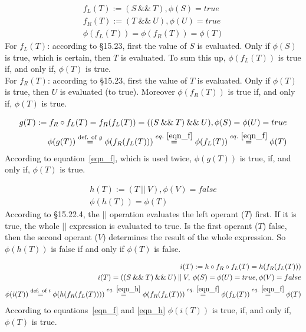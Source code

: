 \begin{equation}\label{eqn_f}\begin{split}
f_{L}(T) := (S \:\&\&\: T), \phi(S) = true\\
f_{R}(T) := (T \:\&\&\: U), \phi(U) = true\\
\phi(f_{L}(T)) = \phi(f_{R}(T)) = \phi(T)
\end{split}\end{equation}
For $f_{L}(T)$: according to §15.23, first the value of $S$ is evaluated. Only if $\phi(S)$ is true, which is certain, then $T$ is evaluated. To sum this up, $\phi(f_{L}(T))$ is true if, and only if, $\phi(T)$ is true.\\
For $f_{R}(T)$: according to §15.23, first the value of $T$ is evaluated. Only if $\phi(T)$ is true, then $U$ is evaluated (to true). Moreover $\phi(f_{R}(T))$ is true if, and only if, $\phi(T)$ is true.

\begin{equation}\label{eqn_g}\begin{split}
g(T) := f_{R} \circ f_{L}(T) = f_{R}(f_{L}(T)) = ((S \: \&\& \: T) \: \&\& \: U), \phi(S) = \phi(U) = true\\
\phi(g(T)) \stackrel{\text{def. of $g$}}{=} \phi(f_{R}(f_{L}(T))) \stackrel{eq.~\eqref{eqn_f}}{=} \phi(f_{L}(T)) \stackrel{eq.~\eqref{eqn_f}}{=} \phi(T)
\end{split}\end{equation}
According to equation~\eqref{eqn_f}, which is used twice, $\phi(g(T))$ is true, if, and only if, $\phi(T)$ is true.

\begin{equation}\label{eqn_h}\begin{split}
h(T) := (T \: || \: V), \phi(V) = false\\
\phi(h(T)) = \phi(T)
\end{split}\end{equation}
According to §15.22.4, the $||$ operation evaluates the left operant ($T$) first. If it is true, the whole $||$ expression is evaluated to true. Is the first operant ($T$) false, then the second operant ($V$) determines the result of the whole expression. So $\phi(h(T))$ is false if and only if $\phi(T)$ is false.

\begin{equation}\label{eqn_i}\begin{split}
i(T) := h \circ f_{R} \circ f_{L}(T) = h(f_{R}(f_{L}(T)))\\
i(T) = ((S \: \&\& \: T) \: \&\& \: U) \: || \: V, \: \phi(S) = \phi(U) = true, \phi(V) = false\\
\phi(i(T)) \stackrel{\text{def. of $i$}}{=} \phi(h(f_{R}(f_{L}(T)))) \stackrel{eq.~\eqref{eqn_h}}{=} \phi(f_{R}(f_{L}(T))) \stackrel{eq.~\eqref{eqn_f}}{=} \phi(f_{L}(T)) \stackrel{eq.~\eqref{eqn_f}}{=} \phi(T)
\end{split}\end{equation}
According to equations~\eqref{eqn_f} and \eqref{eqn_h} $\phi(i(T))$ is true, if, and only if, $\phi(T)$ is true.

